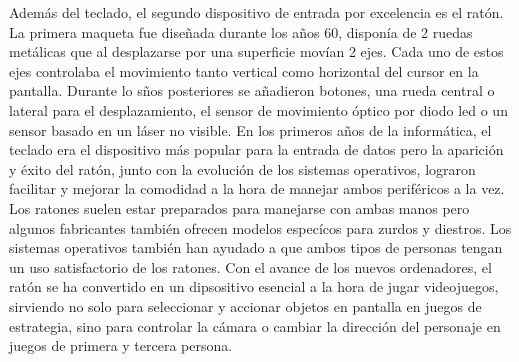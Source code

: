 Adem\'as del teclado, el segundo dispositivo de entrada por excelencia es el rat\'on. La primera maqueta fue dise\~nada durante los a\~nos 60, dispon\'ia de 2 ruedas met\'alicas que al desplazarse por una superficie mov\'ian 2 ejes. Cada uno de estos ejes controlaba el movimiento tanto vertical como horizontal del cursor en la pantalla. Durante lo s\~nos posteriores se a\~nadieron botones, una rueda central o lateral para el desplazamiento, el sensor de movimiento \'optico por diodo led o un sensor basado en un l\'aser no visible. En los primeros a\~nos de la inform\'atica, el teclado era el dispositivo m\'as popular para la entrada de datos pero la aparici\'on y \'exito del rat\'on, junto con la evoluci\'on de los sistemas operativos, lograron facilitar y mejorar la comodidad a la hora de manejar ambos perif\'ericos a la vez. Los ratones suelen estar preparados para manejarse con ambas manos pero algunos fabricantes tambi\'en ofrecen modelos espec\'icos para zurdos y diestros. Los sistemas operativos tambi\'en han ayudado a que ambos tipos de personas tengan un uso satisfactorio de los ratones. Con el avance de los nuevos ordenadores, el rat\'on se ha convertido en un dipsositivo esencial a la hora de jugar videojuegos, sirviendo no solo para seleccionar y accionar objetos en pantalla en juegos de estrategia, sino para controlar la c\'amara o cambiar la direcci\'on del personaje en juegos de primera y tercera persona.\par

